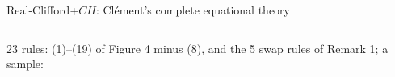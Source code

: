 \begin{frame}{Real-Clifford+$CH$: Clément's complete equational theory \New}
\begin{columns}[c]
\begin{column}{0.53\textwidth}
\begin{code}
\AgdaSpace{}%
\AgdaSpace{}%
\AgdaSpace{}%
\AgdaSpace{}%
\<%
\end{code}
\begin{code}[hide]%
\>[0]\<%
\end{code}
\vspace{-6pt}
{\scriptsize 23 rules: (1)--(19) of Figure 4 minus (8), and the 5 swap rules of Remark 1;
a sample:}
\begin{code}%
\>[0]\AgdaSpace{}%
\AgdaSpace{}%
\AgdaSymbol{:}\AgdaSpace{}%
\AgdaSymbol{(}\AgdaSpace{}%
\AgdaSymbol{:}\AgdaSpace{}%
\AgdaSymbol{)}\AgdaSpace{}%
\AgdaSpace{}%
\AgdaSpace{}%
\AgdaSymbol{(}\AgdaSpace{}%
\AgdaSymbol{)}\AgdaSpace{}%
\<%
\\
\>[0][@{}l@{\AgdaIndent{0}}]%
\>[2]\AgdaSpace{}%
\AgdaSymbol{:}\AgdaSpace{}%
\AgdaSymbol{(}\AgdaSpace{}%
\AgdaSymbol{)}\AgdaSpace{}%
\AgdaSpace{}%
\AgdaSymbol{(}\AgdaSpace{}%
\AgdaSpace{}%
\AgdaSymbol{)}\AgdaSpace{}%
\AgdaOperator{\AgdaPostulate{\textasciicircum{}}}\AgdaSpace{}%
\AgdaSpace{}%
\AgdaOperator{\AgdaDatatype{===}}\AgdaSpace{}%
\<%
\\
%
\>[2]%
\>[14]\AgdaSymbol{:}\AgdaSpace{}%
\AgdaSymbol{(}\AgdaSpace{}%
\AgdaSymbol{)}\AgdaSpace{}%
\AgdaSpace{}%
\AgdaSpace{}%
\AgdaSpace{}%
\AgdaSpace{}%
\AgdaOperator{\AgdaDatatype{===}}\AgdaSpace{}%
\AgdaSpace{}%
\<%
\\
%
\>[2]%
\>[14]\AgdaSymbol{:}\AgdaSpace{}%
\AgdaSymbol{(}\AgdaSpace{}%
\AgdaSymbol{)}\AgdaSpace{}%
%
\>[255I]\AgdaSpace{}%
\AgdaSpace{}%
\AgdaSpace{}%
\AgdaSpace{}%

\end{code}
\end{column}
\end{columns}
\end{frame}
